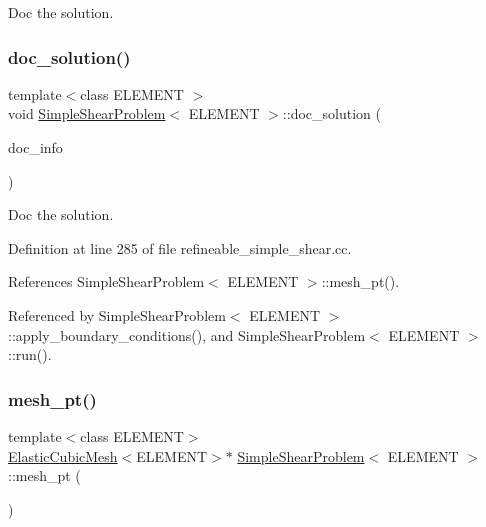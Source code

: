 Doc the solution. 

\mbox{\label{classSimpleShearProblem_a24c087d9ea194229930bcf9f889a048e}} 
\subsubsection{\texorpdfstring{doc\+\_\+solution()}{doc\_solution()}\hspace{0.1cm}{\footnotesize\ttfamily [2/2]}}
{\footnotesize\ttfamily template$<$class E\+L\+E\+M\+E\+NT $>$ \\
void \hyperlink{classSimpleShearProblem}{Simple\+Shear\+Problem}$<$ E\+L\+E\+M\+E\+NT $>$\+::doc\+\_\+solution (\begin{DoxyParamCaption}\item[{Doc\+Info \&}]{doc\+\_\+info }\end{DoxyParamCaption})}



Doc the solution. 



Definition at line 285 of file refineable\+\_\+simple\+\_\+shear.\+cc.



References Simple\+Shear\+Problem$<$ E\+L\+E\+M\+E\+N\+T $>$\+::mesh\+\_\+pt().



Referenced by Simple\+Shear\+Problem$<$ E\+L\+E\+M\+E\+N\+T $>$\+::apply\+\_\+boundary\+\_\+conditions(), and Simple\+Shear\+Problem$<$ E\+L\+E\+M\+E\+N\+T $>$\+::run().

\mbox{\label{classSimpleShearProblem_af1a0759d0c04c749b0f08fb7f936c0c6}} 
\subsubsection{\texorpdfstring{mesh\+\_\+pt()}{mesh\_pt()}\hspace{0.1cm}{\footnotesize\ttfamily [1/2]}}
{\footnotesize\ttfamily template$<$class E\+L\+E\+M\+E\+NT$>$ \\
\hyperlink{classElasticCubicMesh}{Elastic\+Cubic\+Mesh}$<$E\+L\+E\+M\+E\+NT$>$$\ast$ \hyperlink{classSimpleShearProblem}{Simple\+Shear\+Problem}$<$ E\+L\+E\+M\+E\+NT $>$\+::mesh\+\_\+pt (\begin{DoxyParamCaption}{ }\end{DoxyParamCaption})\hspace{0.3cm}{\ttfamily [inline]}}



